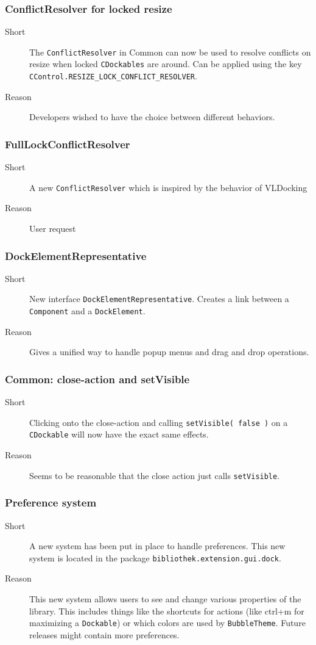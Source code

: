 \documentclass[a4paper,10pt]{article}
\newcommand{\src}[1]{\lstinline[basicstyle=\normalsize\ttfamily,keywordstyle=\normalsize\ttfamily,identifierstyle=\normalsize\ttfamily]|#1|}
\newcommand{\short}{\item[Short]}
\newcommand{\why}{\item[Reason]}
\begin{document}
\subsubsection{ConflictResolver for locked resize}
\begin{description}
 \short The \src{ConflictResolver} in Common can now be used to resolve conflicts on resize when locked \src{CDockables} are around. Can be applied using the key \src{CControl.RESIZE_LOCK_CONFLICT_RESOLVER}.
 \why Developers wished to have the choice between different behaviors.
\end{description}

\subsubsection{FullLockConflictResolver}
\begin{description}
 \short A new \src{ConflictResolver} which is inspired by the behavior of VLDocking
 \why User request
\end{description}

\subsubsection{DockElementRepresentative}
\begin{description}
 \short New interface \src{DockElementRepresentative}. Creates a link between a \src{Component} and a \src{DockElement}.
 \why Gives a unified way to handle popup menus and drag and drop operations.
\end{description}

\subsubsection{Common: close-action and setVisible}
\begin{description}
 \short Clicking onto the close-action and calling \src{setVisible( false )} on a \src{CDockable} will now have the exact same effects.
 \why Seems to be reasonable that the close action just calls \src{setVisible}.
\end{description}

\subsubsection{Preference system}
\begin{description}
 \short A new system has been put in place to handle preferences. This new system is located in the package \src{bibliothek.extension.gui.dock}.
 \why This new system allows users to see and change various properties of the library. This includes things like the shortcuts for actions (like ctrl+m for maximizing a \src{Dockable}) or which colors are used by \src{BubbleTheme}. Future releases might contain more preferences.
\end{description}
\end{document}
